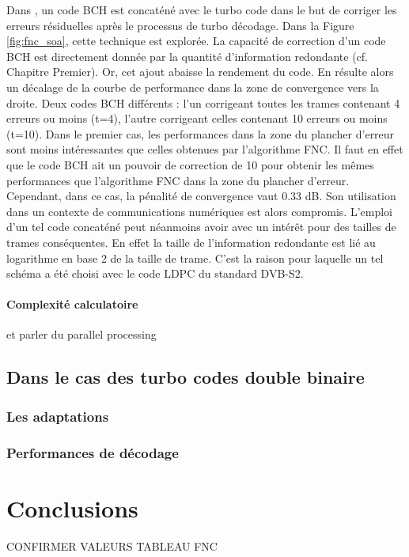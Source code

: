 Dans \cite{andersenBCH}, un code BCH est concaténé avec le turbo code dans le but de corriger les erreurs résiduelles 
après le processus de turbo décodage. Dans la Figure \ref{fig:fnc_soa}, cette technique est explorée. La capacité de 
correction d'un code BCH est directement donnée par la quantité d'information redondante (cf. Chapitre Premier). Or, cet 
ajout abaisse la rendement du code. En résulte alors un décalage de la courbe de performance dans la zone de convergence 
vers la droite. Deux codes BCH différents : l'un corrigeant toutes les trames contenant 4 erreurs ou moins (t=4), l'autre 
corrigeant celles contenant 10 erreurs ou moins (t=10). Dans le premier cas, les performances dans la zone du plancher 
d'erreur sont moins intéressantes que celles obtenues par l'algorithme FNC. Il faut en effet que le code BCH ait un pouvoir
de correction de 10 pour obtenir les mêmes performances que l'algorithme FNC dans la zone du plancher d'erreur. Cependant, 
dans ce cas, la pénalité de convergence vaut 0.33 dB. Son utilisation dans un contexte de communications numériques 
est alors compromis. L'emploi d'un tel code concaténé peut néanmoins avoir avec un intérêt pour des tailles de trames
conséquentes. En effet la taille de l'information redondante est lié au logarithme en base 2 de la taille de trame.
C'est la raison pour laquelle un tel schéma a été choisi avec le code LDPC du standard DVB-S2.



\paragraph*{Complexité calculatoire}


et parler du parallel processing

\subsection{Dans le cas des turbo codes double binaire}

\subsubsection{Les adaptations}

\subsubsection{Performances de décodage}


\section{Conclusions}



CONFIRMER VALEURS TABLEAU FNC